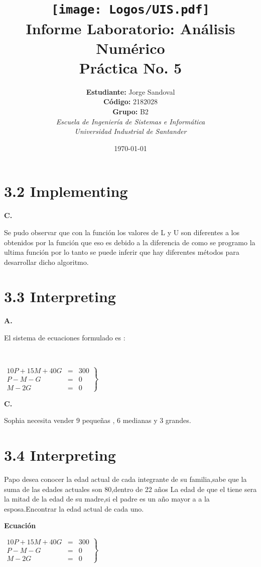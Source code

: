 \documentclass[spanish,notitlepage,letterpaper, 12pt]{article} %
\newcommand{\university}{\normalsize Universidad Industrial de Santander}
\newcommand{\faculty}{\normalsize  Escuela de Ingenier\'ia de Sistemas e Inform\'atica}
\newcommand{\codigo}{\normalsize  2182028}
\newcommand{\grupo}{\normalsize  B2}
\newcommand{\estudiante}{\normalsize  Jorge Sandoval}
\begin{document}
\title{	\vspace{-12mm}\texttt{[image: Logos/UIS.pdf]}\\Informe Laboratorio: An\'alisis Num\'erico\\  \centering Pr\'actica No. 5}
\author{
\textbf{Estudiante:} \estudiante\\ \textbf{C\'odigo:} \codigo\\
\textbf{Grupo:} \grupo\\
\textit{\faculty}\\
\textit{\university}}
\date{\today}
\maketitle

\section*{3.2 Implementing}
\textbf{C.}

Se pudo observar que con la función  los valores de L y U son
diferentes a los obtenidos por la función que  eso es debido a la diferencia de como se programo la ultima función
por lo tanto se puede inferir que hay diferentes métodos para desarrollar dicho algoritmo.

\section*{3.3 Interpreting}
\textbf{A.}

El sistema de ecuaciones formulado es :

\\
\begin{center}
$
\left.
\begin{array}{rcl}
     10P+15M+40G & = & 300
  \\ P-M-G & = & 0
  \\ M-2G & = & 0
\end{array}
\right\}
$ 
    
\end{center}


\textbf{C.}

Sophia necesita vender 9 pequeñas , 6 medianas y 3 grandes.

\section*{3.4 Interpreting}

Papo desea conocer la edad actual de cada integrante de su familia,sabe que la suma de las edades actuales son 80,dentro de 22 años La edad de que el tiene sera la mitad de la edad de su madre,si el padre es un año mayor a a la esposa.Encontrar la edad actual de cada uno.
\vspace{0.2cm}

\textbf{Ecuación}

\begin{center}
$
\left.
\begin{array}{rcl}
     10P+15M+40G & = & 300
  \\ P-M-G & = & 0
  \\ M-2G & = & 0
\end{array}
\right\}
$ 
    
\end{center}
\end{document}
